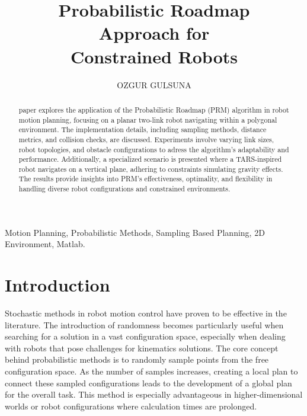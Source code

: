 \documentclass{IEEEtaes}
\begin{document}
\title{\textbf{Probabilistic Roadmap} \\
       \textbf{Approach for} \\
       Constrained Robots
       }


\author{OZGUR GULSUNA}



\editor{}
\supplementary{}




\maketitle

\begin{abstract} paper explores the application of the Probabilistic Roadmap (PRM) algorithm in robot motion planning, focusing on a planar two-link robot navigating within a polygonal environment. The implementation details, including sampling methods, distance metrics, and collision checks, are discussed. Experiments involve varying link sizes, robot topologies, and obstacle configurations to adress the algorithm's adaptability and performance. Additionally, a specialized scenario is presented where a TARS-inspired robot navigates on a vertical plane, adhering to constraints simulating gravity effects. The results provide insights into PRM's effectiveness, optimality, and flexibility in handling diverse robot configurations and constrained environments.
\end{abstract}

\begin{IEEEkeywords}Motion Planning, Probabilistic Methods, Sampling Based Planning, 2D Environment, Matlab.
\end{IEEEkeywords}
\vfill\null


\section{\large \textbf{Introduction}}

{\scshape S}tochastic methods in robot motion control have proven to be effective in the literature. The introduction of randomness becomes particularly useful when searching for a solution in a vast configuration space, especially when dealing with robots that pose challenges for kinematics solutions. The core concept behind probabilistic methods is to randomly sample points from the free configuration space. As the number of samples increases, creating a local plan to connect these sampled configurations leads to the development of a global plan for the overall task. This method is especially advantageous in higher-dimensional worlds or robot configurations where calculation times are prolonged.
\end{document}
